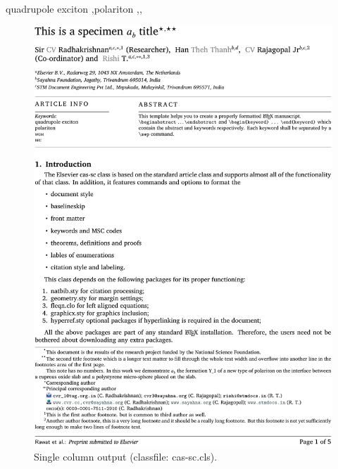 \documentclass[a4paper,12pt]{article}
\makeatletter
\DeclareRobustCommand{\LaTeX}{L\kern-.26em%
        {\sbox\z@ T%
         \vbox to\ht\z@{\hbox{\check@mathfonts
           \fontsize\sf@size\z@
           \math@fontsfalse\selectfont
          A\,}%
         \vss}%
        }%
     \kern-.15em%
    \TeX}
\makeatother
\begin{document}
\begin{vquote}

\begin{abstract}[S U M M A R Y]
This template helps you to create a properly formatted 
 \LaTeX\ manuscript.

\noindent\texttt{\textbackslash begin{abstract}} \dots 
\texttt{\textbackslash end{abstract}} and
\verb+\begin{keyword}+ \verb+...+ \verb+\end{keyword}+ 
which contain the abstract and keywords respectively. 
Each keyword shall be separated by a \verb+\sep+ command.
\end{abstract}

\begin{keywords}
quadrupole exciton \sep polariton \sep \WGM \sep \BEC
\end{keywords}

\maketitle
\end{vquote}

\begin{figure}
\includegraphics[width=\textwidth]{sc-sample.pdf}
\caption{Single column output (classfile: cas-sc.cls).}
\end{figure}
\end{document}
